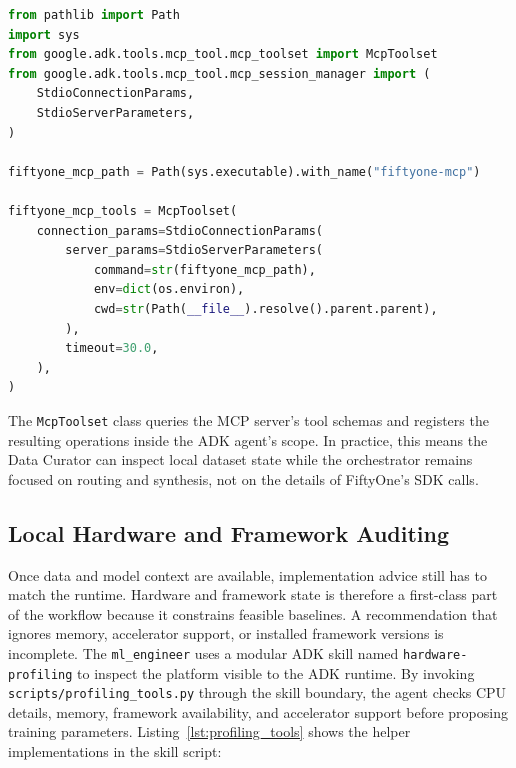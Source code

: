 \documentclass[11pt,a4paper]{article}
\begin{document}
\begin{lstlisting}[language=Python, caption={Configuring a local Stdio MCP session for FiftyOne in \texttt{data\_curator/agent.py}.}]
from pathlib import Path
import sys
from google.adk.tools.mcp_tool.mcp_toolset import McpToolset
from google.adk.tools.mcp_tool.mcp_session_manager import (
    StdioConnectionParams,
    StdioServerParameters,
)

fiftyone_mcp_path = Path(sys.executable).with_name("fiftyone-mcp")

fiftyone_mcp_tools = McpToolset(
    connection_params=StdioConnectionParams(
        server_params=StdioServerParameters(
            command=str(fiftyone_mcp_path),
            env=dict(os.environ),
            cwd=str(Path(__file__).resolve().parent.parent),
        ),
        timeout=30.0,
    ),
)
\end{lstlisting}

The \texttt{McpToolset} class queries the MCP server's tool schemas and registers the resulting operations inside the ADK agent's scope. In practice, this means the Data Curator can inspect local dataset state while the orchestrator remains focused on routing and synthesis, not on the details of FiftyOne's SDK calls.

\subsection{Local Hardware and Framework Auditing}
Once data and model context are available, implementation advice still has to match the runtime. Hardware and framework state is therefore a first-class part of the workflow because it constrains feasible baselines. A recommendation that ignores memory, accelerator support, or installed framework versions is incomplete. The \texttt{ml\_engineer} uses a modular ADK skill named \texttt{hardware-profiling} to inspect the platform visible to the ADK runtime. By invoking \texttt{scripts/profiling\_tools.py} through the skill boundary, the agent checks CPU details, memory, framework availability, and accelerator support before proposing training parameters. Listing~\ref{lst:profiling_tools} shows the helper implementations in the skill script:
\end{document}
